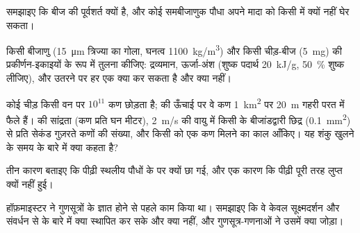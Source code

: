 \begin{exercise}[$\star\star$]\label{exo:b2:plant-life-cycles:8}
समझाइए कि  बीज की पूर्वशर्त क्यों है, और कोई
समबीजाणुक पौधा अपने मादा  को किसी
 में क्यों नहीं घेर सकता।
\end{exercise}

\begin{exercise}[$\star\star$]\label{exo:b2:plant-life-cycles:9}
किसी  बीजाणु (\qty{15}{\micro m} त्रिज्या का गोला, घनत्व
\qty{1100}{kg/m^3}) और किसी चीड़-बीज (\qty{5}{mg}) की प्रकीर्णन-इकाइयों
के रूप में तुलना कीजिए: द्रव्यमान, ऊर्जा-अंश (शुष्क पदार्थ
\qty{20}{kJ/g}, \qty{50}{\%} शुष्क लीजिए), और उतरने पर हर एक क्या कर
सकता है और क्या नहीं।
\end{exercise}

\begin{exercise}[$\star\star\star$]\label{exo:b2:plant-life-cycles:10}
कोई चीड़ किसी वन पर $10^{11}$  कण छोड़ता है; 
की ऊँचाई पर वे कण \qty{1}{km^2} पर \qty{20}{m} गहरी परत में फैले हैं।
 की सांद्रता (कण प्रति घन
मीटर), \qty{2}{m/s} की वायु में किसी  के
बीजांडद्वारी छिद्र (\qty{0.1}{mm^2}) से प्रति सेकंड गुज़रते कणों की
संख्या, और किसी  को एक कण मिलने का काल आँकिए। यह शंकु खुलने के
समय के बारे में क्या कहता है?
\end{exercise}

\begin{exercise}[$\star\star\star$]\label{exo:b2:plant-life-cycles:11}
तीन कारण बताइए कि  पीढ़ी स्थलीय पौधों के  पर
क्यों छा गई, और एक कारण कि  पीढ़ी
पूरी तरह लुप्त क्यों नहीं हुई।
\end{exercise}

\begin{exercise}[$\star\star\star$]\label{exo:b2:plant-life-cycles:12}
हॉफ़माइस्टर ने गुणसूत्रों के ज्ञात होने से पहले काम किया था। समझाइए कि
वे केवल सूक्ष्मदर्शन और संवर्धन से  के बारे में
क्या स्थापित कर सके और क्या नहीं, और गुणसूत्र-गणनाओं ने उसमें क्या
जोड़ा।
\end{exercise}

